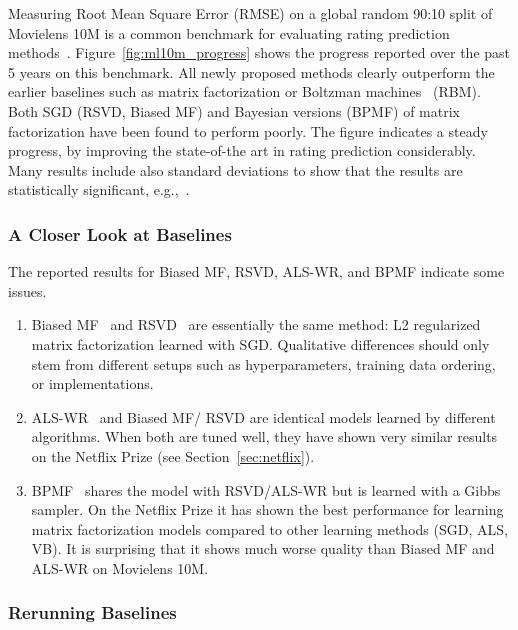 \documentclass{article}
\begin{document}
Measuring Root Mean Square Error (RMSE) on a global random 90:10 split of Movielens 10M is a common benchmark for evaluating  rating prediction methods~\cite{lee:icml13,sedhain:www15,chen:sigir15,zheng:icml16,strub:arxiv16,chen:ijcai16,li:icml16,chen:aaai17,li:nips17}.
Figure~\ref{fig:ml10m_progress} shows the progress reported over the past 5 years on this benchmark.
All newly proposed methods clearly outperform the earlier baselines such as matrix factorization or Boltzman machines~\cite{salakhutdinov:icml07} (RBM).
Both SGD (RSVD, Biased MF) and Bayesian versions (BPMF) of matrix factorization have been found to perform poorly.
The figure indicates a steady progress, by improving the state-of-the art in rating prediction considerably.
Many results include also standard deviations to show that the results are statistically significant, e.g.,~\cite{strub:arxiv16,li:nips17}.



\subsubsection{A Closer Look at Baselines}

The reported results for Biased MF, RSVD, ALS-WR, and BPMF indicate some issues.
\begin{enumerate}
    \item Biased MF~\cite{koren:ieee09} and RSVD~\cite{paterek:kddcup07} are essentially the same method: L2 regularized matrix factorization learned with SGD.
Qualitative differences should only stem from different setups such as hyperparameters, training data ordering, or implementations.
    \item ALS-WR~\cite{zhou:aaim08} and Biased MF/ RSVD are identical models learned by different algorithms.
When both are tuned well, they have shown very similar results on the Netflix Prize (see Section~\ref{sec:netflix}).
    \item BPMF~\cite{salakhutdinov:icml08} shares the model with RSVD/ALS-WR but is learned with a Gibbs sampler.
On the Netflix Prize it has shown the best performance for learning matrix factorization models \cite{salakhutdinov:icml08,rendle:vldb13} compared to other learning methods (SGD, ALS, VB).
It is surprising that it shows much worse quality than Biased MF and ALS-WR on Movielens 10M.
\end{enumerate}

\subsubsection{Rerunning Baselines}
\end{document}
